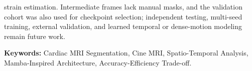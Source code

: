 strain estimation. Intermediate frames lack manual masks, and the validation cohort was also used for checkpoint selection; independent testing, multi-seed training, external validation, and learned temporal or dense-motion modeling remain future work.

\vspace{1em}
\noindent
\textbf{Keywords:} Cardiac MRI Segmentation, Cine MRI, Spatio-Temporal Analysis, Mamba-Inspired Architecture, Accuracy-Efficiency Trade-off.
